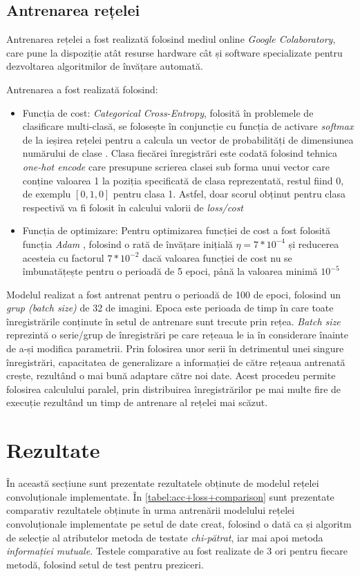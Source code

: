 \subsection{Antrenarea rețelei}\label{ssch:antrenarea}
Antrenarea rețelei a fost realizată folosind mediul online \textit{Google Colaboratory}, care pune la dispoziție atât resurse hardware cât și software specializate pentru dezvoltarea algoritmilor de învățare automată.

Antrenarea a fost realizată folosind:
\begin{itemize}
\item Funcția de cost: \textit{Categorical Cross-Entropy}, folosită în problemele de clasificare multi-clasă, se folosește în conjuncție cu funcția de activare \textit{softmax} de la ieșirea rețelei pentru a calcula un vector de probabilități de dimensiunea numărului de clase \cite{online:CCE-loss}. Clasa fiecărei înregistrări este codată folosind tehnica \textit{one-hot encode} care presupune scrierea clasei sub forma unui vector care conține valoarea 1 la poziția specificată de clasa reprezentată, restul fiind 0, de exemplu $[0,1,0]$ pentru clasa 1. Astfel, doar scorul obținut pentru clasa respectivă va fi folosit în calcului valorii de \textit{loss/cost}
\item Funcția de optimizare: Pentru optimizarea funcției de cost a fost folosită funcția \textit{Adam} \cite{kingma2014adam}, folosind o rată de învățare inițială $\eta=7*10^{-4}$ și reducerea acesteia cu factorul $7*10^{-2}$ dacă valoarea funcției de cost nu se îmbunatățește pentru o perioadă de 5 epoci, până la valoarea minimă $10^{-5}$
\end{itemize}

Modelul realizat a fost antrenat pentru o perioadă de 100 de epoci, folosind un \textit{grup (batch size)} de 32 de imagini. Epoca este perioada de timp în care toate înregistrările conținute în setul de antrenare sunt trecute prin rețea. \textit{Batch size} reprezintă o serie/grup de înregistrări pe care rețeaua le ia în considerare înainte de a-și modifica parametrii. Prin folosirea unor serii în detrimentul unei singure înregistrări, capacitatea de generalizare a informației de către rețeaua antrenată crește, rezultând o mai bună adaptare către noi date. Acest procedeu permite folosirea calculului paralel, prin distribuirea înregistrărilor pe mai multe fire de execuție rezultând un timp de antrenare al rețelei mai scăzut. 

\section{Rezultate}
În această secțiune sunt prezentate rezultatele obținute de modelul rețelei convoluționale implementate. În \autoref{tabel:acc+loss+comparison} sunt prezentate comparativ rezultatele obținute în urma antrenării modelului rețelei convoluționale implementate pe setul de date creat, folosind o dată ca și algoritm de selecție al atributelor metoda de testate \textit{chi-pătrat}, iar mai apoi metoda \textit{informației mutuale}. Testele comparative au fost realizate de 3 ori pentru fiecare metodă, folosind setul de test pentru preziceri.

